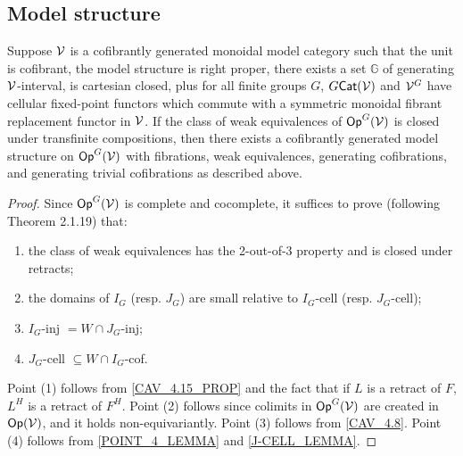 \documentclass[psamsfonts,onesided,10pt,letterpaper]{amsart}%
\renewcommand{\1}{\ensuremath{\mathbb{id}}}
\begin{document}
\subsection{Model structure}

\begin{theorem}
  \label{MODEL_THEOREM}
  Suppose $\mathcal V$ is a cofibrantly generated monoidal model category such that the unit is cofibrant, the model structure is right proper, there exists a set $\mathbb{G}$ of generating $\mathcal V$-interval, is cartesian closed, plus for all finite groups $G$, $G\mathsf{Cat}(\mathcal V)$ and $\mathcal V^G$ have cellular fixed-point functors which commute with a symmetric monoidal fibrant replacement functor in $\mathcal V$. If the class of weak equivalences of $\mathsf{Op}^G(\mathcal V)$ is closed under transfinite compositions, then there exists a cofibrantly generated model structure on $\mathsf{Op}^G(\mathcal V)$ with fibrations, weak equivalences, generating cofibrations, and generating trivial cofibrations as described above.
\end{theorem}
\begin{proof}
  Since $\mathsf{Op}^G(\mathcal V)$ is complete and cocomplete, it suffices to prove (following \cite{Hov98} Theorem 2.1.19) that:
  \begin{enumerate}
  \item the class of weak equivalences has the 2-out-of-3 property and is closed under retracts;
  \item the domains of $I_{G}$ (resp. $J_{G}$) are small relative to $I_{G}$-cell (resp. $J_{G}$-cell);
  \item $I_{G}$-inj $= W\cap J_{G}$-inj;
  \item $J_{G}$-cell $\subseteq W\cap I_{G}$-cof.
  \end{enumerate}
  Point (1) follows from \ref{CAV_4.15_PROP} and the fact that if $L$ is a retract of $F$, $L^H$ is a retract of $F^H$. Point (2) follows since colimits in $\mathsf{Op}^G(\mathcal V)$ are created in $\mathsf{Op}(\mathcal V)$, and it holds non-equivariantly. Point (3) follows from \ref{CAV_4.8}. Point (4) follows from \ref{POINT_4_LEMMA} and \ref{J-CELL_LEMMA}.
\end{proof}





\newpage
{}


\end{document}
